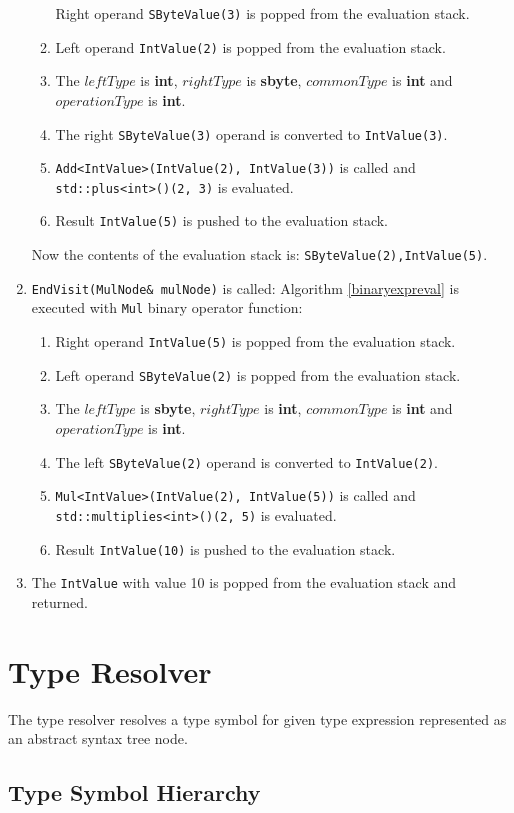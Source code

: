 \documentclass[a4paper,oneside,11pt]{book}
\theoremstyle{definition}
\begin{document}
\begin{enumerate}
\begin{enumerate}
Right operand \verb|SByteValue(3)| is popped from the evaluation stack.
\item
Left operand \verb|IntValue(2)| is popped from the evaluation stack.
\item
The $leftType$ is \textbf{int}, $rightType$ is \textbf{sbyte}, $commonType$ is \textbf{int} and $operationType$ is \textbf{int}.
\item
The right \verb|SByteValue(3)| operand is converted to \verb|IntValue(3)|.
\item
\verb|Add<IntValue>(IntValue(2), IntValue(3))| is called and \verb|std::plus<int>()(2, 3)| is evaluated.
\item
Result \verb|IntValue(5)| is pushed to the evaluation stack.
\end{enumerate}
Now the contents of the evaluation stack is: \verb|SByteValue(2),IntValue(5)|.
\item
\verb|EndVisit(MulNode& mulNode)| is called:
Algorithm \ref{binaryexpreval} is executed with \verb|Mul| binary operator function:
\begin{enumerate}
\item
Right operand \verb|IntValue(5)| is popped from the evaluation stack.
\item
Left operand \verb|SByteValue(2)| is popped from the evaluation stack.
\item
The $leftType$ is \textbf{sbyte}, $rightType$ is \textbf{int}, $commonType$ is \textbf{int} and $operationType$ is \textbf{int}.
\item
The left \verb|SByteValue(2)| operand is converted to \verb|IntValue(2)|.
\item
\verb|Mul<IntValue>(IntValue(2), IntValue(5))| is called and \verb|std::multiplies<int>()(2, 5)| is evaluated.
\item
Result \verb|IntValue(10)| is pushed to the evaluation stack.
\end{enumerate}
\item
The \verb|IntValue| with value 10 is popped from the evaluation stack and returned.
\end{enumerate}

\chapter{Type Resolver}\label{typeresolver}

The type resolver resolves a type symbol for given type expression represented as an abstract syntax tree node.

\section{Type Symbol Hierarchy}\label{typesymbolhierarchy}
\end{document}

